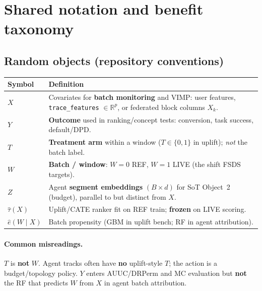 \documentclass[11pt]{article}
\begin{document}
\section{Shared notation and benefit taxonomy}

\subsection{Random objects (repository conventions)}
\begin{center}
\begin{tabular}{@{}p{}p{}@{}}
\toprule
Symbol & Definition \\
\midrule
$X$ & Covariates for \textbf{batch monitoring} and VIMP: user features, \texttt{trace\_features} $\in\mathbb{R}^p$, or federated block columns $X_k$. \\
$Y$ & \textbf{Outcome} used in ranking/concept tests: conversion, task success, default/DPD. \\
$T$ & \textbf{Treatment arm} within a window ($T\in\{0,1\}$ in uplift); \emph{not} the batch label. \\
$W$ & \textbf{Batch / window}: $W=0$ REF, $W=1$ LIVE (the shift FSDS targets). \\
$Z$ & Agent \textbf{segment embeddings} $(B\times d)$ for SoT Object~2 (budget), parallel to but distinct from $X$. \\
$\hat\tau(X)$ & Uplift/CATE ranker fit on REF train; \textbf{frozen} on LIVE scoring. \\
$\hat e(W\mid X)$ & Batch propensity (GBM in uplift bench; RF in agent attribution). \\
\bottomrule
\end{tabular}
\end{center}

\paragraph{Common misreadings.}
$T$ is \textbf{not} $W$. Agent tracks often have \textbf{no} uplift-style $T$; the action is a budget/topology policy. $Y$ enters AUUC/DRPerm and MC evaluation but \textbf{not} the RF that predicts $W$ from $X$ in agent batch attribution.
\end{document}
